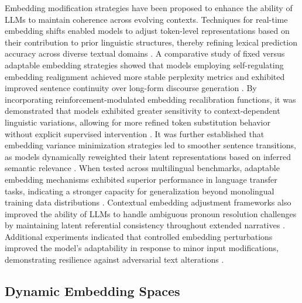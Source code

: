 \documentclass{article}
\begin{document}
Embedding modification strategies have been proposed to enhance the ability of LLMs to maintain coherence across evolving contexts. Techniques for real-time embedding shifts enabled models to adjust token-level representations based on their contribution to prior linguistic structures, thereby refining lexical prediction accuracy across diverse textual domains \cite{murph2024dynamic}. A comparative study of fixed versus adaptable embedding strategies showed that models employing self-regulating embedding realignment achieved more stable perplexity metrics and exhibited improved sentence continuity over long-form discourse generation \cite{embury2024dynamic}. By incorporating reinforcement-modulated embedding recalibration functions, it was demonstrated that models exhibited greater sensitivity to context-dependent linguistic variations, allowing for more refined token substitution behavior without explicit supervised intervention \cite{mcintosh2024inadequacy}. It was further established that embedding variance minimization strategies led to smoother sentence transitions, as models dynamically reweighted their latent representations based on inferred semantic relevance \cite{fa2024modality}. When tested across multilingual benchmarks, adaptable embedding mechanisms exhibited superior performance in language transfer tasks, indicating a stronger capacity for generalization beyond monolingual training data distributions \cite{giacomozzi2024innovative}. Contextual embedding adjustment frameworks also improved the ability of LLMs to handle ambiguous pronoun resolution challenges by maintaining latent referential consistency throughout extended narratives \cite{racus2024dynamic}. Additional experiments indicated that controlled embedding perturbations improved the model’s adaptability in response to minor input modifications, demonstrating resilience against adversarial text alterations \cite{ taillieu2024dynamic}.

\subsection{Dynamic Embedding Spaces}
\end{document}
